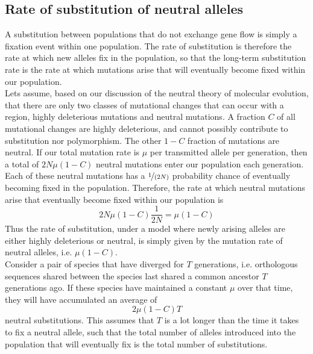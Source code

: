 \subsection{Rate of substitution of neutral alleles}

A substitution between populations that do not exchange gene flow is simply a
fixation event within one population. The rate of substitution is therefore the
rate at which new alleles fix in the population, so that the long-term
substitution rate is the rate at which mutations arise that will eventually
become fixed within our population.\\

Lets assume, based on our discussion of the neutral theory of molecular evolution, that there are only two classes of mutational changes that can occur with a
region, highly deleterious mutations and neutral mutations. A fraction $C$ of
all mutational changes are highly deleterious, and cannot possibly contribute
to substitution nor polymorphism.  The other $1-C$ fraction
of mutations are neutral. If our total mutation rate is $\mu$ per transmitted allele
per generation, then a total of $2N \mu (1-C)$ neutral mutations enter our
population each generation.\\

Each of these neutral mutations has a $\nicefrac{1}{(2N)}$ probability chance of
eventually becoming fixed in the population. Therefore, the rate at
which neutral mutations arise that eventually become fixed within our
population is
\begin{equation}
2N\mu(1-C)\frac{1}{2N} = \mu(1-C)
\end{equation}
Thus the rate of substitution, under a model where newly arising alleles are either
highly deleterious or neutral, is simply given by the mutation rate
of neutral alleles, i.e. $\mu(1-C)$.\\

Consider a pair of species that have diverged for $T$ generations, i.e. orthologous sequences shared between the species last shared a common ancestor $T$ generations ago. If these species have maintained a constant $\mu$ over that time, they will have accumulated an average of
\begin{equation}
2\mu(1-C)T \label{eqn:moleclock}
\end{equation}
neutral substitutions. This assumes that $T$ is a lot longer than the time it
takes to fix a neutral allele, such that the total number of
alleles introduced into the population that will eventually fix is the
total number of substitutions.\\

